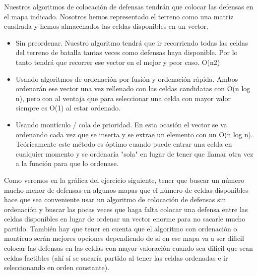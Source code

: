 Nuestros algoritmos de colocación de defensas tendrán que colocar las defensas en el mapa indicado. Nosotros hemos representado el terreno como una matriz cuadrada y hemos almacenados las celdas disponibles en un vector.
\begin{itemize}
	\item Sin preordenar. Nuestro algoritmo tendrá que ir recorriendo todas las celdas del terreno de batalla tantas veces como defensas haya disponible. Por lo tanto tendrá que recorrer ese vector en el mejor y peor caso. O(n2)
	\item Usando algoritmos de ordenación por fusión y ordenación rápida. Ambos ordenarán ese vector una vez rellenado con las celdas candidatas con O(n log n), pero con al ventaja que para seleccionar una celda con mayor valor siempre es O(1) al estar ordenado.
	\item Usando montículo / cola de prioridad. En esta ocasión el vector se va ordenando cada vez que se inserta y se extrae un elemento con un O(n log n). Teóricamente este método es óptimo cuando puede entrar una celda en cualquier momento y se ordenaría "sola" en lugar de tener que llamar otra vez a la función para que lo ordenase.
\end{itemize}
Como veremos en la gráfica del ejercicio siguiente, tener que buscar un número mucho menor de defensas en algunos mapas que el número de celdas disponibles hace que sea conveniente usar un algoritmo de colocación de defensas sin ordenación y buscar las pocas veces que haga falta colocar una defensa entre las celdas disponibles en lugar de ordenar un vector enorme para no sacarle mucho partido. También hay que tener en cuenta que el algoritmo con ordenación o montícuo serán mejores opciones dependiendo de si en ese mapa va a ser dificil colocar las defensas en las celdas con mayor valoración cuando sea dificil que sean celdas factibles (ahí sí se sacaría partido al tener las celdas ordenadas e ir seleccionando en orden constante).
